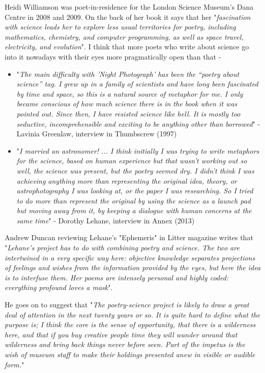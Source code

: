\documentclass[11pt]{article}
\begin{document}
Heidi Williamson was poet-in-residence for the London Science Museum’s Dana Centre in 2008 and 2009. On the back of her book it says that her "\textit{fascination with science leads her to explore less usual territories for poetry, including mathematics, chemistry, and computer programming, as well as space travel, electricity, and evolution}". I think that more poets who write about science go into it nowadays with their eyes more pragmatically open than that -

\begin{itemize}
\item "\textit{The main difficulty with 'Night Photograph' has been the “poetry about science” tag. I grew up in a family of scientists and have long been fascinated by time and space, so this is a natural source of metaphor for me. I only became conscious of how much science there is in the book when it was pointed out. Since then, I have resisted science like hell. It is mostly too seductive, incomprehensible and exciting to be anything other than borrowed}" -  Lavinia Greenlaw, interview in Thumbscrew (1997)

\item "\textit{I married an astronomer!  ... I think initially I was trying to write metaphors for the science, based on human experience but that wasn’t working out so well, the science was present, but the poetry seemed dry. I didn’t think I was achieving anything more than representing the original idea, theory, or astrophotography I was looking at, or the paper I was researching. So I tried to do more than represent the original by using the science as a launch pad but moving away from it, by keeping a dialogue with human concerns at the same time}" - Dorothy Lehane, interview in Annex (2013)

\end{itemize}

Andrew Duncan reviewing Lehane's "Ephemeris" in Litter magazine writes that "\textit{Lehane’s project has to do with combining poetry and science. The two are intertwined in a very specific way here: objective knowledge separates projections of feelings and wishes from the information provided by the eyes, but here the idea is to interfuse them. Her poems are intensely personal and highly coded: everything profound loves a mask}". 

He goes on to suggest that "\textit{The poetry-science project is likely to draw a great deal of attention in the next twenty years or so. It is quite hard to define what the purpose is; I think the core is the sense of opportunity, that there is a wilderness here, and that if you buy creative people time they will wander around that wilderness and bring back things never before seen. Part of the impetus is the wish of museum staff to make their holdings presented anew in visible or audible form.}"
\end{document}

